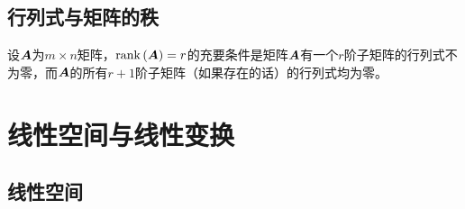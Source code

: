 \documentclass{ctexart}
\begin{document}
\subsection{行列式与矩阵的秩}

\begin{theorem}
    设\(\boldsymbol{A}\)为\(m\times n\)矩阵，\(\mathrm{rank}\left( \boldsymbol{A} \right)=r\)的充要条件是矩阵\(\boldsymbol{A}\)有一个\(r\)阶子矩阵的行列式不为零，而\(\boldsymbol{A}\)的所有\(r+1\)阶子矩阵（如果存在的话）的行列式均为零。
\end{theorem}

\clearpage

\section{线性空间与线性变换}

\subsection{线性空间}
\end{document}
